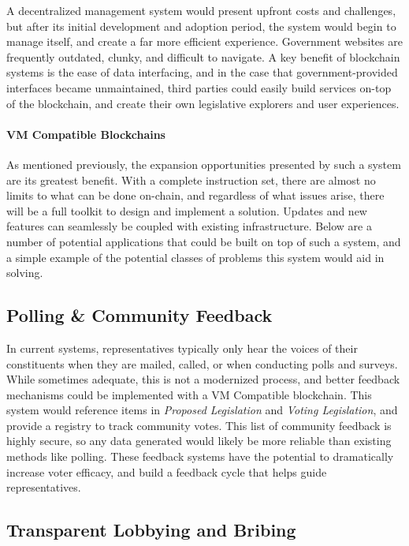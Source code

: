 \documentclass[letterpaper,twocolumn]{article}
\begin{document}
A decentralized management system would present upfront costs and challenges, but after its initial development and adoption period, the system would begin to manage itself, and create a far more efficient experience.  Government websites are frequently outdated, clunky, and difficult to navigate.  A key benefit of blockchain systems is the ease of data interfacing, and in the case that government-provided interfaces became unmaintained, third parties could easily build services on-top of the blockchain, and create their own legislative explorers and user experiences.


\paragraph{VM Compatible Blockchains}
As mentioned previously, the expansion opportunities presented by such a system are its greatest benefit.  With a complete instruction set, there are almost no limits to what can be done on-chain, and regardless of what issues arise, there will be a full toolkit to design and implement a solution. Updates and new features can seamlessly be coupled with existing infrastructure. Below are a number of potential applications that could be built on top of such a system, and a simple example of the potential classes of problems this system would aid in solving.

\subsection*{Polling \& Community Feedback}

In current systems, representatives typically only hear the voices of their constituents when they are mailed, called, or when conducting polls and surveys.  While sometimes adequate, this is not a modernized process, and better feedback mechanisms could be implemented with a VM Compatible blockchain.  This system would reference items in \textit{Proposed Legislation} and \textit{Voting Legislation}, and provide a registry to track community votes.  This list of community feedback is highly secure, so any data generated would likely be more reliable than existing methods like polling.  These feedback systems have the potential to dramatically increase voter efficacy, and build a feedback cycle that helps guide representatives.

\subsection*{Transparent Lobbying and Bribing}
\end{document}
